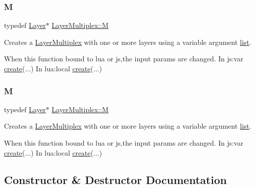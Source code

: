 \subsubsection{\texorpdfstring{M}{M}\hspace{0.1cm}{\footnotesize\ttfamily [1/2]}}
{\footnotesize\ttfamily typedef \hyperlink{classLayer}{Layer}$\ast$ \hyperlink{classLayerMultiplex_a47ea9ae27cb9c95490a017ab01952487}{Layer\+Multiplex\+::M}}

Creates a \hyperlink{classLayerMultiplex}{Layer\+Multiplex} with one or more layers using a variable argument \hyperlink{protocollist-p}{list}. 
\begin{DoxyCode}
When \textcolor{keyword}{this} \textcolor{keyword}{function} bound to lua or js,the input params are changed.
In js:var \hyperlink{classLayerMultiplex_ab95b14187c4219ab1052b8708052dfdc}{create}(...)
In lua:local \hyperlink{classLayerMultiplex_ab95b14187c4219ab1052b8708052dfdc}{create}(...)
\end{DoxyCode}
 \mbox{\label{classLayerMultiplex_a47ea9ae27cb9c95490a017ab01952487}} 
\subsubsection{\texorpdfstring{M}{M}\hspace{0.1cm}{\footnotesize\ttfamily [2/2]}}
{\footnotesize\ttfamily typedef \hyperlink{classLayer}{Layer}$\ast$ \hyperlink{classLayerMultiplex_a47ea9ae27cb9c95490a017ab01952487}{Layer\+Multiplex\+::M}}

Creates a \hyperlink{classLayerMultiplex}{Layer\+Multiplex} with one or more layers using a variable argument \hyperlink{protocollist-p}{list}. 
\begin{DoxyCode}
When \textcolor{keyword}{this} \textcolor{keyword}{function} bound to lua or js,the input params are changed.
In js:var \hyperlink{classLayerMultiplex_ab95b14187c4219ab1052b8708052dfdc}{create}(...)
In lua:local \hyperlink{classLayerMultiplex_ab95b14187c4219ab1052b8708052dfdc}{create}(...)
\end{DoxyCode}
 

\subsection{Constructor \& Destructor Documentation}
\mbox{\label{classLayerMultiplex_a9867834efbc7a54d948ccc909c2da3b5}} 
